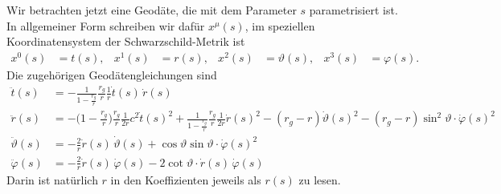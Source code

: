 Wir betrachten jetzt eine Geodäte, die mit dem Parameter $s$ parametrisiert ist.
In allgemeiner Form schreiben wir dafür $x^\mu(s)$, im speziellen
Koordinatensystem der Schwarzschild-Metrik ist
\[
\begin{aligned}
x^0(s)&=t(s),
&
x^1(s)&=r(s),
&
x^2(s)&=\vartheta(s),
&
x^3(s)&=\varphi(s).
\end{aligned}
\]
Die zugehörigen Geodätengleichungen sind
\begin{align*}
\ddot t(s)
&=
-\frac{1}{1-\displaystyle\frac{r_g}{r}}\frac{r_g}{r}\frac{1}{r}\dot t(s)\,\dot r(s)
\\
\ddot r(s)
&=
-\biggl(1-\frac{r_g}{r}\biggr)\frac{r_g}{r}\frac1{2r}c^2\dot t(s)^2
+\frac{1}{1-\displaystyle\frac{r_g}{r}} \frac{r_g}{r}\frac1{2r}\dot r(s)^2
-(r_g-r)\dot \vartheta(s)^2
-(r_g-r)\sin^2 \vartheta \cdot \dot \varphi(s)^2
\\
\ddot \vartheta(s)
&=
-\frac{2}{r} \dot r(s)\, \dot \vartheta(s)
+\cos\vartheta\sin\vartheta \cdot \dot\varphi(s)^2
\\
\ddot \varphi(s)
&=
-\frac{2}{r} \dot r(s)\,\dot \varphi(s)
-2\cot\vartheta \cdot \dot r(s)\,\dot\varphi(s)
\end{align*}
Darin ist natürlich $r$ in den Koeffizienten jeweils als $r(s)$ zu lesen.

